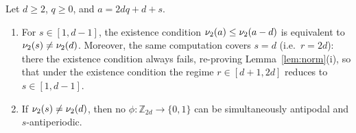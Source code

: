 \begin{lemma}\label{lem:2adic-b}
Let $d \ge 2$, $q \ge 0$, and $a = 2dq + d + s$.
\begin{enumerate}
\item[(a)] For $s \in [1, d-1]$, the existence condition
$\nu_2(a) \le \nu_2(a - d)$ is equivalent to $\nu_2(s) \ne \nu_2(d)$.
Moreover, the same computation covers $s = d$ (i.e.\ $r = 2d$): there the
existence condition always fails, re-proving Lemma~\ref{lem:norm}(i), so
that under the existence condition the regime $r \in [d+1, 2d]$ reduces to
$s \in [1, d-1]$.
\item[(b)] If $\nu_2(s) \ne \nu_2(d)$, then no
$\phi \colon \mathbb{Z}_{2d} \to \{0,1\}$ can be simultaneously antipodal
and $s$-antiperiodic.
\end{enumerate}
\end{lemma}

